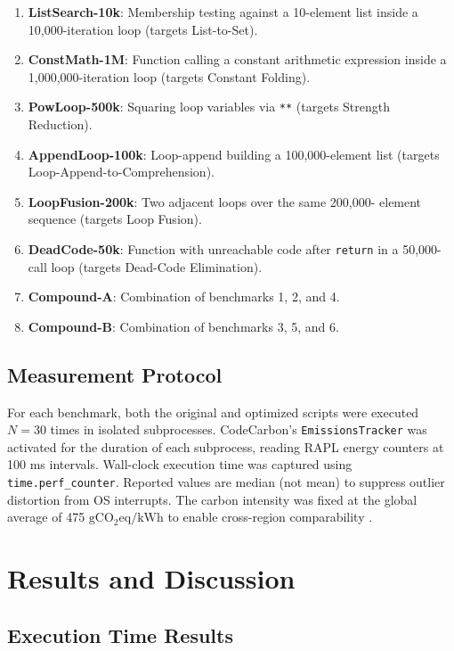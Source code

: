 \documentclass[conference]{IEEEtran}
\begin{document}
\begin{enumerate}
  \item \textbf{ListSearch-10k}: Membership testing against a 10-element
        list inside a 10,000-iteration loop (targets List-to-Set).
  \item \textbf{ConstMath-1M}: Function calling a constant arithmetic
        expression inside a 1,000,000-iteration loop (targets Constant Folding).
  \item \textbf{PowLoop-500k}: Squaring loop variables via \texttt{**}
        (targets Strength Reduction).
  \item \textbf{AppendLoop-100k}: Loop-append building a 100,000-element
        list (targets Loop-Append-to-Comprehension).
  \item \textbf{LoopFusion-200k}: Two adjacent loops over the same 200,000-
        element sequence (targets Loop Fusion).
  \item \textbf{DeadCode-50k}: Function with unreachable code after
        \texttt{return} in a 50,000-call loop (targets Dead-Code Elimination).
  \item \textbf{Compound-A}: Combination of benchmarks 1, 2, and 4.
  \item \textbf{Compound-B}: Combination of benchmarks 3, 5, and 6.
\end{enumerate}

\subsection{Measurement Protocol}

For each benchmark, both the original and optimized scripts were executed
$N = 30$ times in isolated subprocesses.  CodeCarbon's
\texttt{EmissionsTracker} was activated for the duration of each subprocess,
reading RAPL energy counters at 100 ms intervals.  Wall-clock execution time
was captured using \texttt{time.perf\_counter}.  Reported values are median
(not mean) to suppress outlier distortion from OS interrupts.  The carbon
intensity was fixed at the global average of 475 $\mathrm{gCO_2eq/kWh}$ to
enable cross-region comparability \cite{ref11}.

\section{Results and Discussion}

\subsection{Execution Time Results}
\end{document}

